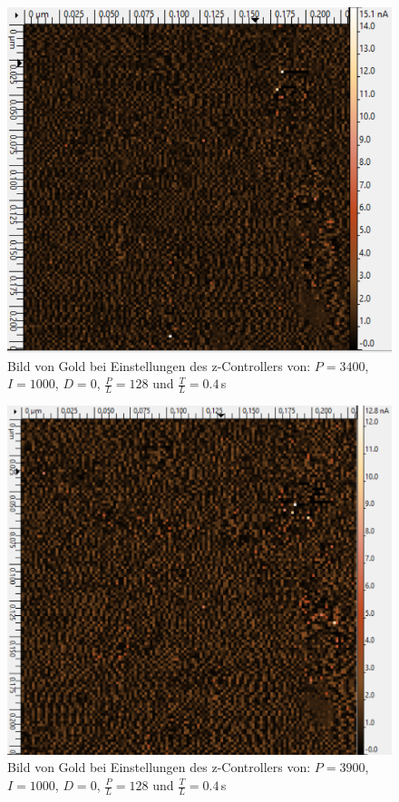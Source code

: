 \begin{figure}[ht]
	\includegraphics[scale=0.5]{Bild/Para/P3}
	\centering
	\caption[Parameter Änderung 3]{Bild von Gold bei Einstellungen des z-Controllers von: $P=3400$, $I=1000$, $D=0$, $\frac{P}{L}=128$ und $\frac{T}{L}=0.4\,$s}
\end{figure}
\begin{figure}[ht]
	\includegraphics[scale=0.5]{Bild/Para/P4}
	\centering
	\caption[Parameter Änderung 4]{Bild von Gold bei Einstellungen des z-Controllers von: $P=3900$, $I=1000$, $D=0$, $\frac{P}{L}=128$ und $\frac{T}{L}=0.4\,$s}
\end{figure}
